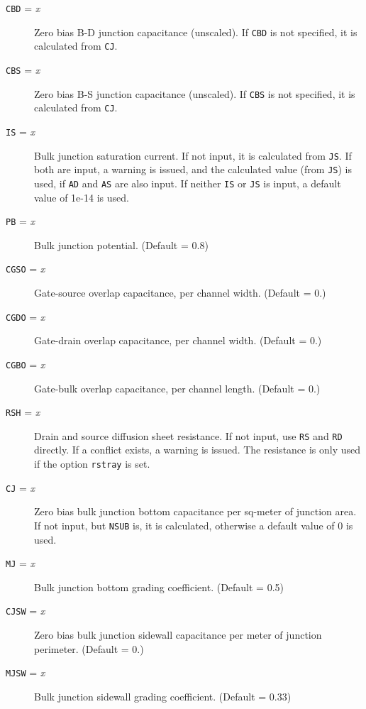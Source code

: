 \begin{description}
\item[{\tt CBD} = {\it x}] Zero bias B-D junction capacitance (unscaled).  
If {\tt CBD} is not specified, it is calculated from {\tt CJ}.

\item[{\tt CBS} = {\it x}] Zero bias B-S junction capacitance (unscaled).  
If {\tt CBS} is not specified, it is calculated from {\tt CJ}.

\item[{\tt IS} = {\it x}] Bulk junction saturation current.  If not input,
it is calculated from {\tt JS}.  If both are input, a warning is issued, and
the calculated value (from {\tt JS}) is used, if {\tt AD} and {\tt AS} are
also input.  If neither {\tt IS} or {\tt JS} is input, a default value of
1e-14 is used.

\item[{\tt PB} = {\it x}] Bulk junction potential. (Default = 0.8)

\item[{\tt CGSO} = {\it x}] Gate-source overlap capacitance, per channel
width. (Default = 0.)

\item[{\tt CGDO} = {\it x}] Gate-drain overlap capacitance, per channel
width. (Default = 0.)

\item[{\tt CGBO} = {\it x}] Gate-bulk overlap capacitance, per channel
length. (Default = 0.)

\item[{\tt RSH} = {\it x}] Drain and source diffusion sheet resistance.  If
not input, use {\tt RS} and {\tt RD} directly.  If a conflict exists, a
warning is issued.  The resistance is only used if the option {\tt rstray}
is set.

\item[{\tt CJ} = {\it x}] Zero bias bulk junction bottom capacitance per
sq-meter of junction area.  If not input, but {\tt NSUB} is, it is
calculated, otherwise a default value of 0 is used.

\item[{\tt MJ} = {\it x}] Bulk junction bottom grading coefficient. (Default
= 0.5)

\item[{\tt CJSW} = {\it x}] Zero bias bulk junction sidewall capacitance per
meter of junction perimeter. (Default = 0.)

\item[{\tt MJSW} = {\it x}] Bulk junction sidewall grading coefficient.
(Default = 0.33)


\end{description}
